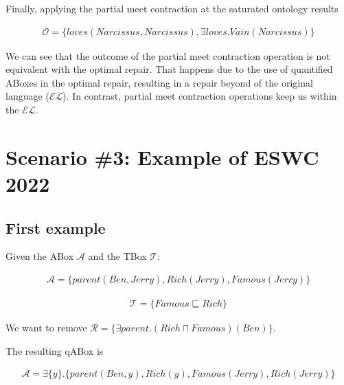 Finally, applying the partial meet contraction at the saturated ontology results

\begin{equation*}
    \begin{aligned}
        \mathcal{O} = \{ loves(Narcissus, Narcissus), \exists loves.Vain(Narcissus) \}
    \end{aligned}
\end{equation*}

We can see that the outcome of the partial meet contraction operation is not equivalent with the optimal repair. That happens due to the use of quantified ABoxes in the optimal repair, resulting in a repair beyond of the original language ($\mathcal{EL}$). In contrast, partial meet contraction operations keep us within the $\mathcal{EL}$.

\section{Scenario \#3: Example of ESWC 2022}
\label{sec:scenario-3}

\subsection{First example}

Given the ABox $\mathcal{A} $ and the TBox $\mathcal{T}$:

\begin{equation*}
    \begin{aligned}
        \mathcal{A} = \{ parent(Ben, Jerry), Rich(Jerry), Famous(Jerry) \}
    \end{aligned}
\end{equation*}

\begin{equation*}
    \begin{aligned}
        \mathcal{T} = \{ Famous \sqsubseteq Rich \}
    \end{aligned}
\end{equation*}

We want to remove $\mathcal{R} = \{ \exists parent.(Rich \sqcap Famous)(Ben) \}$.

The resulting qABox is

\begin{equation*}
    \begin{aligned}
        \mathcal{A} = \exists \{ y \}.\{ parent(Ben, y), Rich(y), Famous(Jerry), Rich(Jerry) \}
    \end{aligned}
\end{equation*}

